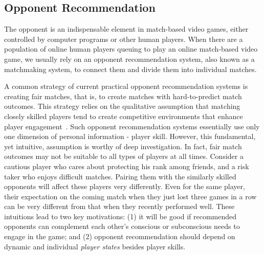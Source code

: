 



\subsection{Opponent Recommendation}

The opponent is an indispensable element in match-based video games, either controlled by computer programs or other human players. When there are a population of online human players queuing to play an online match-based video game, we usually rely on an opponent recommendation system, also known as a matchmaking system, to connect them and divide them into individual matches. 

A common strategy of current practical opponent recommendation systems is creating fair matches, that is, to create matches with hard-to-predict match outcomes. This strategy relies on the qualitative assumption that matching closely skilled players tend to create competitive environments that enhance player engagement~\cite{sweetser2005gameflow,flow1990psychology,chen2007flow,graepel2006ranking}. Such opponent recommendation systems essentially use only one dimension of personal information - player skill. However, this fundamental, yet intuitive, assumption is worthy of deep investigation. In fact, fair match outcomes may not be suitable to all types of players at all times. Consider a cautious player who cares about protecting his rank among friends, and a risk taker who enjoys difficult matches. Pairing them with the similarly skilled opponents will affect these players very differently. Even for the same player, their expectation on the coming match when they just lost three games in a row can be very different from that when they recently performed well. These intuitions lead to two key motivations: (1) it will be good if recommended opponents can complement each other's conscious or subconscious needs to engage in the game; and (2) opponent recommendation should depend on dynamic and individual \emph{player states} besides player skills.

